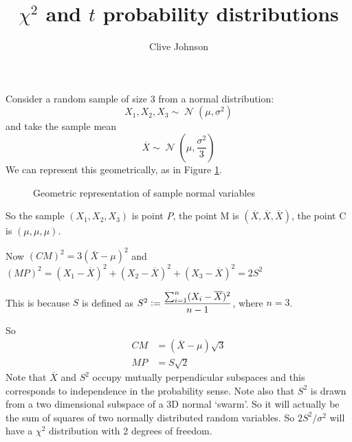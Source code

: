 \documentclass[fleqn,a4paper,11pt]{article}
\title{\(\chi^2\) and \(t\) probability distributions}
\author{Clive Johnson}
\DeclareMathOperator{\Normal}{\mathcal N}
\newcommand{\defeq}{\vcentcolon=}
\newcommand*\mean[1]{\overline{#1}}
\newcommand*\lseg[1]{\mathit{#1}}
\begin{document}
\maketitle

Consider a random sample of size \(3\) from a normal distribution:
\begin{equation*}
X_1,X_2,X_3 \sim \Normal(\mu, \sigma^2)
\end{equation*}
and take the sample mean
\begin{equation*}
\mean X \sim \Normal(\mu, \frac{\sigma^2}{3})
\end{equation*}
We can represent this geometrically, as in Figure \ref{fig_1}.

\begin{figure}[h]
\begin{center}
\end{center}
\caption{Geometric representation of sample normal variables}
\label{fig_1}
\end{figure}

So the sample \((X_1, X_2, X_3)\) is point \(P\), the point M is
\((\mean X, \mean X, \mean X)\), the point C is
\((\mu, \mu, \mu)\).

Now \((\lseg{CM})^2 = 3(\mean X - \mu)^2\) and \\
\((\lseg{MP})^2 =
  (X_1 - \mean X)^2 + (X_2 - \mean X)^2 + (X_3 - \mean X)^2 =
  2S^2\)

This is because \(S\) is defined as
\(S^2 \defeq \dfrac{\sum_{i=1}^n(X_i - \mean X)^2}{n - 1}\), where \(n = 3\).

So
\begin{align*}
\lseg{CM} &= (\mean X - \mu)\sqrt 3 \\
\lseg{MP} &= S \sqrt 2
\end{align*}
Note that \(\mean X\) and \(S^2\) occupy mutually perpendicular subspaces
and this corresponds to independence in the probability sense. Note also that
\(S^2\) is drawn from a two dimensional subspace of a 3D normal `swarm'. So it
will actually be the sum of squares of two normally distributed random
variables. So \(2S^2/\sigma^2\) will have a \(\chi^2\) distribution with 2
degrees of freedom.
\end{document}
